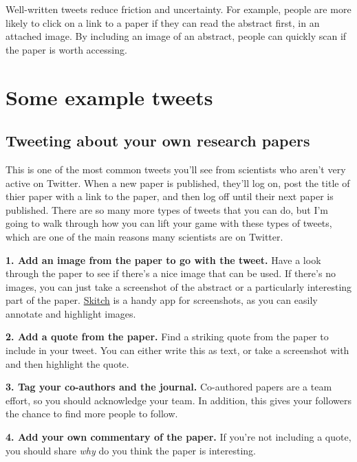 \documentclass[]{book}
\begin{document}
Well-written tweets reduce friction and uncertainty. For example, people are more likely to click on a link to a paper if they can read the abstract first, in an attached image. By including an image of an abstract, people can quickly scan if the paper is worth accessing.

\hypertarget{some-example-tweets}{%
\section{Some example tweets}\label{some-example-tweets}}

\hypertarget{tweeting-about-your-own-research-papers}{%
\subsection{Tweeting about your own research papers}\label{tweeting-about-your-own-research-papers}}

This is one of the most common tweets you'll see from scientists who aren't very active on Twitter. When a new paper is published, they'll log on, post the title of thier paper with a link to the paper, and then log off until their next paper is published. There are so many more types of tweets that you can do, but I'm going to walk through how you can lift your game with these types of tweets, which are one of the main reasons many scientists are on Twitter.

\textbf{1. Add an image from the paper to go with the tweet.} Have a look through the paper to see if there's a nice image that can be used. If there's no images, you can just take a screenshot of the abstract or a particularly interesting part of the paper. \href{https://evernote.com/products/skitch}{Skitch} is a handy app for screenshots, as you can easily annotate and highlight images.

\textbf{2. Add a quote from the paper.} Find a striking quote from the paper to include in your tweet. You can either write this as text, or take a screenshot with and then highlight the quote.

\textbf{3. Tag your co-authors and the journal.} Co-authored papers are a team effort, so you should acknowledge your team. In addition, this gives your followers the chance to find more people to follow.

\textbf{4. Add your own commentary of the paper.} If you're not including a quote, you should share \emph{why} do you think the paper is interesting.
\end{document}

